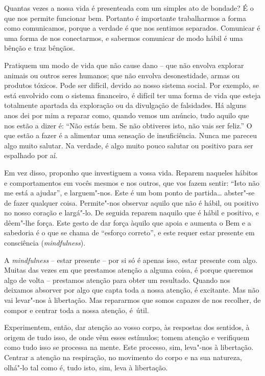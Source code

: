 Quantas vezes a nossa vida é presenteada com um simples ato de bondade? É o que
nos permite funcionar bem. Portanto é importante trabalharmos a forma como
comunicamos, porque a verdade é que nos sentimos separados. Comunicar é uma
forma de nos conectarmos, e sabermos comunicar de modo hábil é uma bênção e traz
bênçãos.

Pratiquem um modo de vida que não cause dano -- que não envolva explorar animais
ou outros seres humanos; que não envolva desonestidade, armas ou produtos
tóxicos. Pode ser difícil, devido ao nosso sistema social. Por exemplo, se está
envolvido com o sistema financeiro, é difícil ter uma forma de vida que esteja
totalmente apartada da exploração ou da divulgação de falsidades. Há alguns anos
dei por mim a reparar como, quando vemos um anúncio, tudo aquilo que nos estão a
dizer é: ``Não estás bem. Se não obtiveres isto, não vais ser feliz.'' O que
estão a fazer é a alimentar uma sensação de insuficiência. Nunca me pareceu algo
muito salutar. Na verdade, é algo muito pouco salutar ou positivo para ser
espalhado por aí.

Em vez disso, proponho que investiguem a vossa vida. Reparem naqueles hábitos e
comportamentos em vocês mesmos e nos outros, que vos fazem sentir: ``Isto não me
está a ajudar'', e larguem"-nos. Este é um bom ponto de partida\ldots{} abster"-se
de fazer qualquer coisa. Permite"-nos observar aquilo que não é hábil, ou
positivo no nosso coração e largá"-lo. De seguida reparem naquilo que é hábil e
positivo, e dêem"-lhe força. Este gesto de dar força àquilo que apoia e aumenta
o Bem e a sabedoria é o que se chama de ``esforço correto'', e este requer
estar presente em consciência (\emph{mindfulness}).

A \emph{mindfulness} -- estar presente -- por si só é apenas isso, estar
presente com algo. Muitas das vezes em que prestamos atenção a alguma coisa, é
porque queremos algo de volta -- prestamos atenção para obter um resultado.
Quando nos deixamos absorver por algo que capta toda a nossa atenção, é
excitante. Mas não vai levar"-nos à libertação. Mas repararmos que somos capazes
de nos recolher, de compor e centrar toda a nossa atenção, é~útil.

Experimentem, então, dar atenção ao vosso corpo, às respostas dos sentidos, à
origem de tudo isso, de onde vêm esses estímulos; tomem atenção e verifiquem
como tudo isso se processa na mente. Este processo, sim, leva"-nos à libertação.
Centrar a atenção na respiração, no movimento do corpo e na sua natureza,
olhá"-lo tal como é, tudo isto, sim, leva à libertação.

